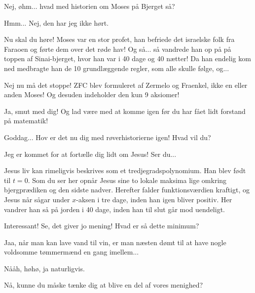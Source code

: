 \documentclass[a4paper,11pt]{article}
\begin{document}
\begin{sketch}
 Nej, øhm... hvad med historien om Moses på Bjerget så?

 Hmm... Nej, den har jeg ikke hørt.


 Nu skal du høre! Moses var en stor profet, han befriede det israelske folk fra Faraoen og førte dem over det røde hav! Og så... så vandrede han op på på toppen af Sinai-bjerget, hvor han var i 40 dage og 40 nætter! Da han endelig kom ned medbragte han de 10 grundlæggende regler, som alle skulle følge, og...

 Nej nu må det stoppe! ZFC blev formuleret af Zermelo og Fraenkel, ikke en eller anden Moses! Og desuden indeholder den kun 9 aksiomer!


 Ja, smut med dig! Og lad være med at komme igen før du har fået lidt forstand på matematik!


 Goddag... Hov er det nu dig med røverhistorierne igen! Hvad vil du?

 Jeg er kommet for at fortælle dig lidt om Jesus! Ser du...


 Jesus liv kan rimeligvis beskrives som et tredjegradspolynomium. Han blev født til $t = 0$. Som du ser her opnår Jesus sine to lokale maksima lige omkring bjergprædiken og den sidste nadver. Herefter falder funktionsværdien kraftigt, og Jesus når sågar under $x$-aksen i tre dage, inden han igen bliver positiv. Her vandrer han så på jorden i 40 dage, inden han til slut går mod uendeligt.

 Interessant! Se, det giver jo mening! Hvad er så dette minimum?

 Jaa, når man kan lave vand til vin, er man næsten dømt til at have nogle voldsomme tømmermænd en gang imellem...

 Nååh, høhø, ja naturligvis.

 Nå, kunne du måske tænke dig at blive en del af vores menighed?


\end{sketch}
\end{document}
